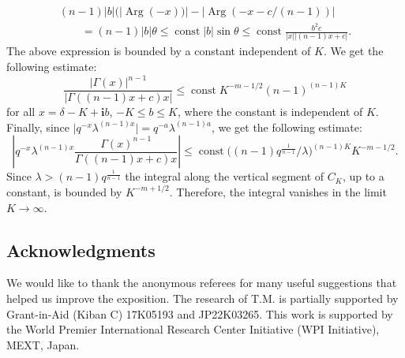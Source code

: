 \documentclass[pdftex]{sigma}
\numberwithin{equation}{section}
\newcommand{\ii}{\mathbf{i}}
\begin{document}
\begin{gather*}
(n-1)|b|(
|{\operatorname{Arg}}(-x))|-|{\operatorname{Arg}}(-x-c/(n-1) )| \\
\qquad=
(n-1)|b|\theta \leq
\operatorname{const} |b|\sin\theta \leq
\operatorname{const}
\frac{b^2 c}{|x| |(n-1)x+c|}.
\end{gather*}
The above expression is bounded by a constant independent of $K$. We get the following estimate:
\[
\frac{|\Gamma(x)|^{n-1}}{
|\Gamma((n-1)x+c) x| }\leq
\operatorname{const}
K^{-m-1/2}
(n-1)^{(n-1) K}
\]
for all $x=\delta-K + \ii b$, $-K\leq b\leq K$, where the constant is independent of $K$. Finally, since $\big|q^{-x}\lambda^{(n-1)x}\big|=q^{-a}\lambda^{(n-1)a}$, we get the following estimate:
\[
\left|
q^{-x}\lambda^{(n-1)x}
\frac{\Gamma(x)^{n-1}}{
\Gamma((n-1)x+c) x }
\right| \leq \operatorname{const}
\big((n-1) q^{\frac{1}{n-1}}/\lambda\big)^{(n-1)K}
K^{-m-1/2}.
\]
Since $\lambda> (n-1) q^{\frac{1}{n-1}}$ the integral along the vertical segment of $C_K$, up to a constant, is bounded by $K^{-m+1/2}$. Therefore, the integral vanishes in the limit $K\to \infty$.

\subsection*{Acknowledgments}
We would like to thank the anonymous referees for many useful
suggestions that helped us improve the exposition.
The research of T.M. is partially supported by Grant-in-Aid (Kiban C)
17K05193 and JP22K03265. This work is supported by the World Premier International Research
Center Initiative (WPI Initiative), MEXT, Japan.
\end{document}
